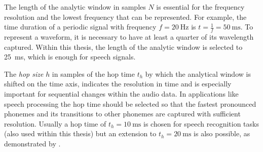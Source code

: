 The length of the analytic window in samples $N$ is essential for the frequency resolution and the lowest frequency that can be represented.
For example, the time duration of a periodic signal with frequency $f=\SI{20}{\hertz}$ is $t=\frac{1}{f} = \SI{50}{\milli\second}$.
To represent a waveform, it is necessary to have at least a quarter of its wavelength captured.
Within this thesis, the length of the analytic window is selected to \SI{25}{\milli\second}, which is enough for speech signals.

The \emph{hop size} $h$ in samples of the hop time $t_h$ by which the analytical window is shifted on the time axis, indicates the resolution in time and is especially important for sequential changes within the audio data.
In applications like speech processing the hop time should be selected so that the fastest pronounced phonemes and its transitions to other phonemes are captured with sufficient resolution.
Usually a hop time of $t_{h}=\SI{10}{\milli\second}$ is chosen for speech recognition tasks (also used within this thesis) but an extension to $t_{h}=\SI{20}{\milli\second}$ is also possible, as demonstrated by \cite{Peter2020}.

